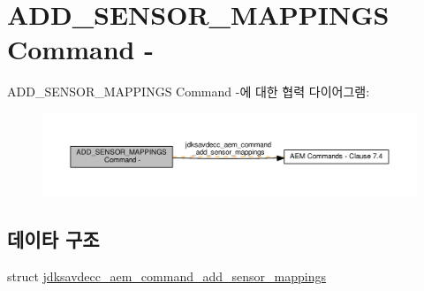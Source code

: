 \hypertarget{group__command__add__sensor__mappings}{}\section{A\+D\+D\+\_\+\+S\+E\+N\+S\+O\+R\+\_\+\+M\+A\+P\+P\+I\+N\+GS Command -\/}
\label{group__command__add__sensor__mappings}
A\+D\+D\+\_\+\+S\+E\+N\+S\+O\+R\+\_\+\+M\+A\+P\+P\+I\+N\+GS Command -\/에 대한 협력 다이어그램\+:
\nopagebreak
\begin{figure}[H]
\begin{center}
\leavevmode
\includegraphics[width=350pt]{group__command__add__sensor__mappings}
\end{center}
\end{figure}
\subsection*{데이타 구조}
\begin{DoxyCompactItemize}
\item 
struct \hyperlink{structjdksavdecc__aem__command__add__sensor__mappings}{jdksavdecc\+\_\+aem\+\_\+command\+\_\+add\+\_\+sensor\+\_\+mappings}
\end{DoxyCompactItemize}
